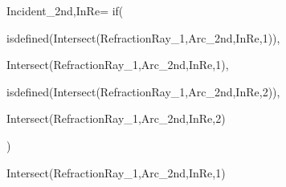 Incident_{2nd,InRe}=
  if(

    isdefined(Intersect(RefractionRay_{1},Arc_{2nd,InRe},1)),

    Intersect(RefractionRay_{1},Arc_{2nd,InRe},1),

    isdefined(Intersect(RefractionRay_{1},Arc_{2nd,InRe},2)),

    Intersect(RefractionRay_{1},Arc_{2nd,InRe},2)

  )

    Intersect(RefractionRay_{1},Arc_{2nd,InRe},1)
